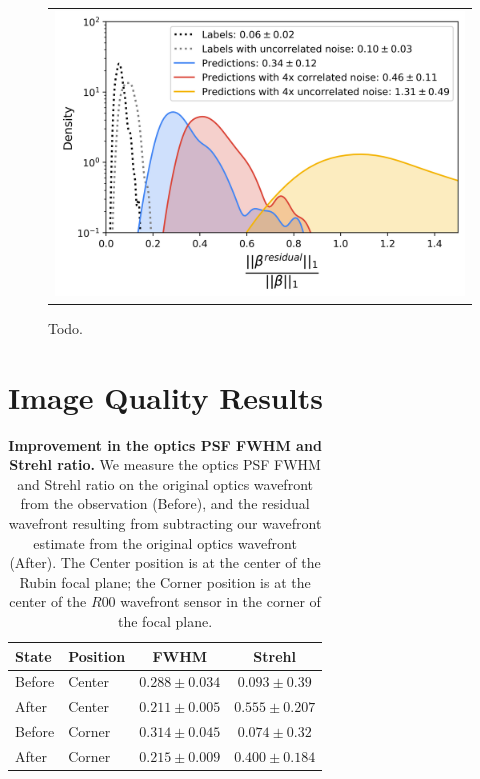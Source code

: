 \begin{figure}[!htbp]
\begin{center}
\begin{tabular}{c}
\includegraphics[width=\textwidth]{figs/interp/dist_defense.png}
\end{tabular}
\end{center}
\caption[Todo]{Todo.\label{fig:beta-results}}
\end{figure}


\section{Image Quality Results}

\begin{table}
{
    \begin{center}
    \begin{tabular}{|l|l|c|c|}
    \hline
    State & Position & FWHM & Strehl\\
    \hline
    Before & Center & $0.288 \pm 0.034$ & $0.093 \pm 0.39$ \\
    After & Center & $0.211 \pm 0.005$ &  $0.555 \pm 0.207$\\
    \hline
    Before & Corner & $0.314 \pm 0.045$ & $0.074 \pm 0.32$\\
    After & Corner & $0.215 \pm 0.009$ & $0.400 \pm 0.184$\\
    \hline
    \end{tabular}
    \end{center}
}
\caption{\textbf{Improvement in the optics PSF FWHM and Strehl ratio.} We measure the optics PSF FWHM and Strehl ratio on the original optics wavefront from the observation (Before), and the residual wavefront resulting from subtracting our wavefront estimate from the original optics wavefront (After). The Center position is at the center of the Rubin focal plane; the Corner position is at the center of the $R00$ wavefront sensor in the corner of the focal plane.}
\label{tab:corrections}
\end{table}

